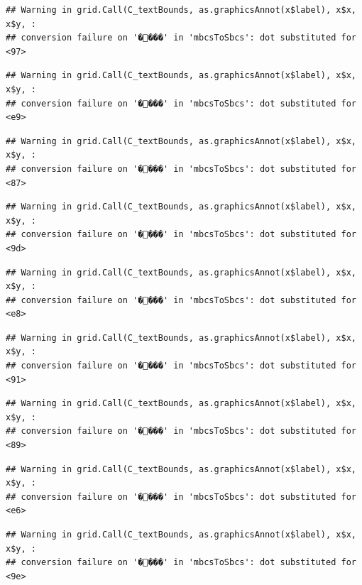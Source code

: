 \documentclass[
]{article}
\begin{document}
\begin{verbatim}
## Warning in grid.Call(C_textBounds, as.graphicsAnnot(x$label), x$x, x$y, :
## conversion failure on '����' in 'mbcsToSbcs': dot substituted for <97>
\end{verbatim}

\begin{verbatim}
## Warning in grid.Call(C_textBounds, as.graphicsAnnot(x$label), x$x, x$y, :
## conversion failure on '����' in 'mbcsToSbcs': dot substituted for <e9>
\end{verbatim}

\begin{verbatim}
## Warning in grid.Call(C_textBounds, as.graphicsAnnot(x$label), x$x, x$y, :
## conversion failure on '����' in 'mbcsToSbcs': dot substituted for <87>
\end{verbatim}

\begin{verbatim}
## Warning in grid.Call(C_textBounds, as.graphicsAnnot(x$label), x$x, x$y, :
## conversion failure on '����' in 'mbcsToSbcs': dot substituted for <9d>
\end{verbatim}

\begin{verbatim}
## Warning in grid.Call(C_textBounds, as.graphicsAnnot(x$label), x$x, x$y, :
## conversion failure on '����' in 'mbcsToSbcs': dot substituted for <e8>
\end{verbatim}

\begin{verbatim}
## Warning in grid.Call(C_textBounds, as.graphicsAnnot(x$label), x$x, x$y, :
## conversion failure on '����' in 'mbcsToSbcs': dot substituted for <91>
\end{verbatim}

\begin{verbatim}
## Warning in grid.Call(C_textBounds, as.graphicsAnnot(x$label), x$x, x$y, :
## conversion failure on '����' in 'mbcsToSbcs': dot substituted for <89>
\end{verbatim}

\begin{verbatim}
## Warning in grid.Call(C_textBounds, as.graphicsAnnot(x$label), x$x, x$y, :
## conversion failure on '����' in 'mbcsToSbcs': dot substituted for <e6>
\end{verbatim}

\begin{verbatim}
## Warning in grid.Call(C_textBounds, as.graphicsAnnot(x$label), x$x, x$y, :
## conversion failure on '����' in 'mbcsToSbcs': dot substituted for <9e>
\end{verbatim}
\end{document}
